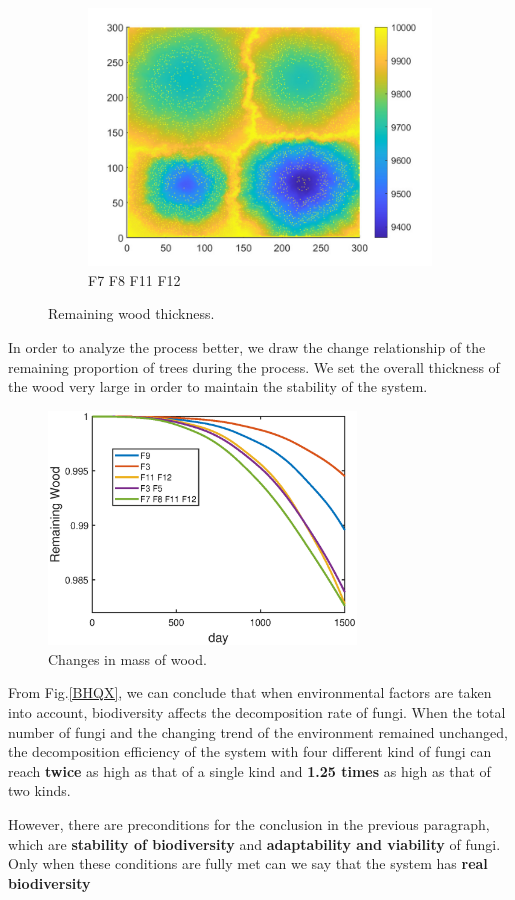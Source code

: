 \documentclass[a4paper,12pt]{article}
\begin{document}
\begin{figure}[H]
\begin{subfigure}{0.3\textwidth}
		\includegraphics[width=\textwidth]{./T5Figure/K4N1/K4N1L.pdf}
		\caption{F7 F8 F11 F12}
	\end{subfigure}
	\caption{Remaining wood thickness.}
	\label{SYHD}
\end{figure}

\par In order to analyze the process better, we draw the change relationship of the remaining proportion of trees during the process. We set the overall thickness of the wood very large in order to maintain the stability of the system.
\vspace{-0.5cm}
\begin{figure}[H] 
	\centering 
	\includegraphics[height=6.2cm]{./T5Figure/T5overAll.eps}
	\caption{Changes in mass of wood.}
	\label{BHQX}
\end{figure}
\vspace{-0.3cm}
\par From Fig.\eqref{BHQX}, we can conclude that when environmental factors are taken into account, biodiversity affects the decomposition rate of fungi. When the total number of fungi and the changing trend of the environment remained unchanged, the decomposition efficiency of the system with four different kind of fungi can reach \textbf{twice} as high as that of a single kind and \textbf{1.25 times} as high as that of two kinds.
\par However, there are preconditions for the conclusion in the previous paragraph, which are \textbf{stability of biodiversity} and \textbf{adaptability and viability} of fungi. Only when these conditions are fully met can we say that the system has \textbf{real biodiversity}
\end{document}
